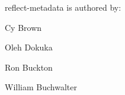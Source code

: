 reflect-\/metadata is authored by\+:
\begin{DoxyItemize}
\item Cy Brown
\item Oleh Dokuka
\item Ron Buckton
\item William Buchwalter 
\end{DoxyItemize}